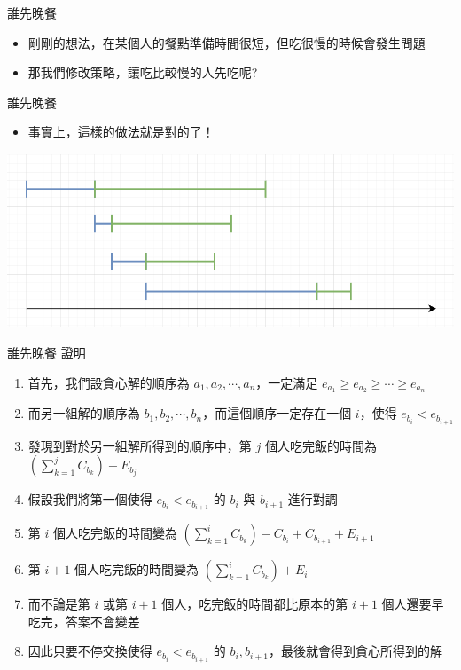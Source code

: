 \documentclass[aspectratio=169]{beamer}
\begin{document}
    \begin{frame}{誰先晚餐}
        \begin{itemize}
            \item 剛剛的想法，在某個人的餐點準備時間很短，但吃很慢的時候會發生問題
            \item<2-> 那我們修改策略，讓吃比較慢的人先吃呢?
        \end{itemize}
    \end{frame}
    
    \begin{frame}{誰先晚餐}
        \begin{itemize}
            \item 事實上，這樣的做法就是對的了！
        \end{itemize}
        \begin{center}
            \includegraphics[scale=0.5]{images/who_dinner_first_2.png}
        \end{center}
    \end{frame}
    
    \begin{frame}{誰先晚餐 證明}
        \begin{enumerate}
            \item 首先，我們設貪心解的順序為 $a_1, a_2, \cdots, a_n$，一定滿足 $e_{a_1} \ge e_{a_2} \ge \cdots \ge e_{a_n}$
            \item 而另一組解的順序為 $b_1, b_2, \cdots, b_n$，而這個順序一定存在一個 $i$，使得 $e_{b_i} < e_{b_{i+1}}$
            \item 發現到對於另一組解所得到的順序中，第 $j$ 個人吃完飯的時間為 $(\sum_{k=1}^j C_{b_k}) + E_{b_j}$
            \item 假設我們將第一個使得 $e_{b_i} < e_{b_{i+1}}$ 的 $b_i$ 與 $b_{i+1}$ 進行對調
            \item 第 $i$ 個人吃完飯的時間變為 $(\sum_{k=1}^i C_{b_k}) - C_{b_i} + C_{b_{i+1}} + E_{i+1}$
            \item 第 $i+1$ 個人吃完飯的時間變為 $(\sum_{k=1}^i C_{b_k}) + E_{i}$
            \item 而不論是第 $i$ 或第 $i+1$ 個人，吃完飯的時間都比原本的第 $i+1$ 個人還要早吃完，答案不會變差
            \item 因此只要不停交換使得 $e_{b_i} < e_{b_{i+1}}$ 的 $b_i, b_{i+1}$，最後就會得到貪心所得到的解
        \end{enumerate}
    \end{frame}
    
\end{document}
